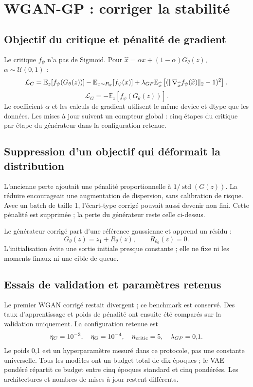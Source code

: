 \documentclass[11pt,a4paper]{article}
\newcommand{\E}{\mathbb E}
\begin{document}
\newpage
\section{WGAN-GP : corriger la stabilité}
\subsection*{Objectif du critique et pénalité de gradient}
Le critique $f_\psi$ n'a pas de Sigmoid. Pour $\widehat x=\alpha x+(1-\alpha)G_\theta(z)$, $\alpha\sim\mathcal U(0,1)$ :
\[
\mathcal L_C=\E_z[f_\psi(G_\theta(z))]-\E_{x\sim P_{\rm tr}}[f_\psi(x)]
+\lambda_{GP}\E_{\widehat x}\left[(\|\nabla_{\widehat x}f_\psi(\widehat x)\|_2-1)^2\right].
\]
\[
\boxed{\mathcal L_G=-\E_z[f_\psi(G_\theta(z))].}
\]
Le coefficient $\alpha$ et les calculs de gradient utilisent le même device et dtype que les données. Les mises à jour suivent un compteur global : cinq étapes du critique par étape du générateur dans la configuration retenue.

\subsection*{Suppression d'un objectif qui déformait la distribution}
L'ancienne perte ajoutait une pénalité proportionnelle à $1/\operatorname{std}(G(z))$. La réduire encourageait une augmentation de dispersion, sans calibration de risque. Avec un batch de taille 1, l'écart-type corrigé pouvait aussi devenir non fini. Cette pénalité est supprimée ; la perte du générateur reste celle ci-dessus.

Le générateur corrigé part d'une référence gaussienne et apprend un résidu :
\[
G_\theta(z)=z_1+R_\theta(z),\qquad R_{\theta_0}(z)=0.
\]
L'initialisation évite une sortie initiale presque constante ; elle ne fixe ni les moments finaux ni une cible de queue.

\subsection*{Essais de validation et paramètres retenus}
Le premier WGAN corrigé restait divergent ; ce benchmark est conservé. Des taux d'apprentissage et poids de pénalité ont ensuite été comparés sur la validation uniquement. La configuration retenue est
\[
\eta_C=10^{-3},\quad\eta_G=10^{-4},\quad n_{\rm critic}=5,
\quad\lambda_{GP}=0{,}1.
\]
Le poids 0,1 est un hyperparamètre mesuré dans ce protocole, pas une constante universelle. Tous les modèles ont un budget total de dix époques ; le VAE pondéré répartit ce budget entre cinq époques standard et cinq pondérées. Les architectures et nombres de mises à jour restent différents.
\end{document}
